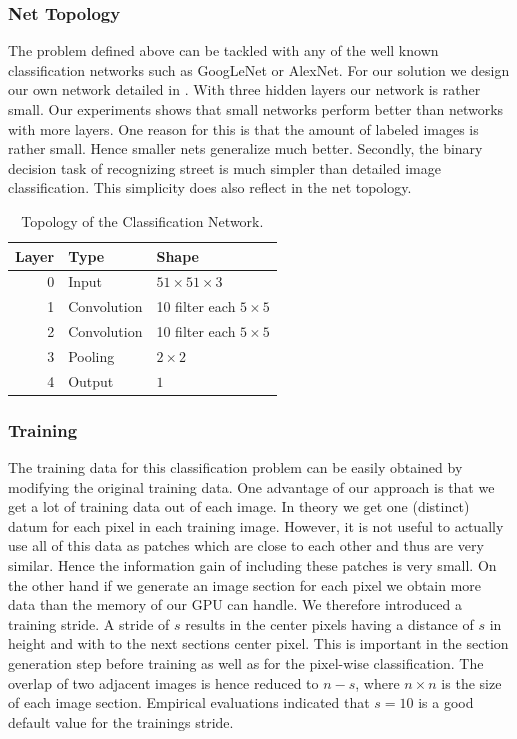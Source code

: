 \subsubsection{Net Topology}
The problem defined above can be tackled with any of the well known
classification networks such as GoogLeNet or AlexNet. For our solution we design our
own network detailed in . With three hidden layers our network
is rather small. Our experiments shows that small networks perform better
than networks with more layers. One reason for this is that the amount of
labeled images is rather small. Hence smaller nets generalize much better.
Secondly, the binary decision task of recognizing street is much simpler than
detailed image classification. This simplicity does also reflect in the net
topology.

\begin{table}[H]
	\normalsize
	\centering
\begin{tabular}{r  l l}
	\toprule
	\textbf{Layer} & \textbf{Type}  & \textbf{Shape}  \\
	\midrule
	0     & Input &  $51 \times 51 \times 3$ \\
	1     & Convolution & 10 filter  each $5 \times 5$ \\
	2     & Convolution & 10 filter  each $5 \times 5$  \\
	3     & Pooling     & $2 \times 2$ \\
	4     & Output     & $1$ \\
	\bottomrule
\end{tabular}
\caption{Topology of the Classification Network.}
\label{tab:topo}
\end{table}


\subsubsection{Training}
The training data for this classification problem can be easily obtained by
modifying the original training data. One advantage of our approach is that we
get a lot of training data out of each image. In theory we get one (distinct)
datum for each pixel in each training image. However, it is not useful to
actually use all of this data as patches which are close to each other and thus
are very similar. Hence the information gain of including these patches is very
small. On the other hand if we generate an image section for each pixel we
obtain more data than the memory of our GPU can handle. We therefore introduced
a training stride. A stride of $s$ results in the center pixels having a
distance of $s$ in height and with to the next sections center pixel. This is
important in the section generation step before training as well as for the
pixel-wise classification. The overlap of two adjacent images is hence reduced
to $n-s$, where $n \times n$ is the size of each image section. Empirical
evaluations indicated that $s=10$ is a good default value for the trainings
stride.

